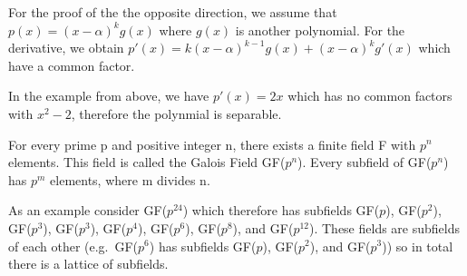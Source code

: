 For the proof of the the opposite direction, we assume that
\(p(x) = (x-\alpha)^k g(x)\) where \(g(x)\) is another polynomial. For
the derivative, we obtain
\(p'(x) = k(x-\alpha)^{k-1} g(x) + (x-\alpha)^k g'(x)\) which have a
common factor.

In the example from above, we have \(p'(x) = 2x\) which has no common
factors with \(x^2-2\), therefore the polynmial is separable.

For every prime p and positive integer n, there exists a finite field F
with \(p^n\) elements. This field is called the Galois Field
GF(\(p^n\)). Every subfield of GF(\(p^n\)) has \(p^m\) elements, where m
divides n.

As an example consider GF(\(p^{24}\)) which therefore has subfields
GF(\(p\)), GF(\(p^2\)), GF(\(p^3\)), GF(\(p^3\)), GF(\(p^4\)),
GF(\(p^6\)), GF(\(p^8\)), and GF(\(p^{12}\)). These fields are subfields
of each other (e.g.~GF(\(p^6\)) has subfields GF(\(p\)), GF(\(p^2\)),
and GF(\(p^3\))) so in total there is a lattice of subfields.
